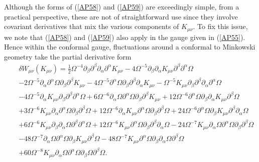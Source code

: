 Although the forms of (\ref{AP58}) and (\ref{AP59}) are exceedingly simple, from a practical perspective, these are not of straightforward use since they involve covariant derivatives that mix the various components of $K_{\mu\nu}$. To fix this issue, we note that (\ref{AP58}) and (\ref{AP59}) also apply in the gauge given in (\ref{AP55}). Hence within the conformal gauge, fluctuations around a conformal to Minkowski geometry take the partial derivative form
%
\begin{eqnarray}
&&\delta W_{\mu\nu}(K_{\mu\nu})=\frac{1}{2}\Omega^{-4}\partial_{\beta}\partial^{\beta}\partial_{\alpha}\partial^{\alpha}K_{\mu \nu}-  4\Omega^{-5} \partial_{\beta}\partial_{\alpha}K_{\mu \nu} \partial^{\beta}\partial^{\alpha}\Omega 
\nonumber\\
&&- 2\Omega^{-5}  \partial_{\alpha}\partial^{\alpha}\Omega \partial_{\beta}\partial^{\beta}K_{\mu \nu}-  4 \Omega^{-5}\partial^{\alpha}\Omega \partial_{\beta}\partial^{\beta}\partial_{\alpha}K_{\mu \nu}  
-  \Omega^{-5}K_{\mu \nu} \partial_{\beta}\partial^{\beta}\partial_{\alpha}\partial^{\alpha}\Omega 
\nonumber\\
&& -  4\Omega^{-5} \partial_{\alpha}K_{\mu \nu} \partial_{\beta}\partial^{\beta}\partial^{\alpha}\Omega 
+ 6\Omega^{-6} \partial_{\alpha}\Omega \partial^{\alpha}\Omega \partial_{\beta}\partial^{\beta}K_{\mu \nu} + 12\Omega^{-6} \partial^{\alpha}\Omega \partial_{\beta}\partial_{\alpha}K_{\mu \nu} \partial^{\beta}\Omega 
\nonumber\\
&&+ 3\Omega^{-6} K_{\mu \nu} \partial_{\alpha}\partial^{\alpha}\Omega \partial_{\beta}\partial^{\beta}\Omega + 12 \Omega^{-6}\partial_{\alpha}K_{\mu \nu} \partial^{\alpha}\Omega \partial_{\beta}\partial^{\beta}\Omega+ 24\Omega^{-6}  \partial^{\alpha}\Omega \partial_{\beta}K_{\mu \nu} \partial^{\beta}\partial_{\alpha}\Omega  
\nonumber\\
&&+ 6\Omega^{-6} K_{\mu \nu} \partial_{\beta}\partial_{\alpha}\Omega \partial^{\beta}\partial^{\alpha}\Omega 
+ 12\Omega^{-6} K_{\mu \nu} \partial^{\alpha}\Omega \partial_{\beta}\partial^{\beta}\partial_{\alpha}\Omega -  24 \Omega^{-7}K_{\mu \nu} \partial_{\alpha}\Omega \partial^{\alpha}\Omega \partial_{\beta}\partial^{\beta}\Omega  
\nonumber\\
&&-  48\Omega^{-7}  \partial_{\alpha}\Omega \partial^{\alpha}\Omega \partial_{\beta}K_{\mu \nu} \partial^{\beta}\Omega-  48\Omega^{-7}  K_{\mu \nu} \partial^{\alpha}\Omega \partial_{\beta}\partial_{\alpha}\Omega \partial^{\beta}\Omega 
\nonumber\\
&&
+ 60\Omega^{-8} K_{\mu \nu} \partial_{\alpha}\Omega \partial^{\alpha}\Omega \partial_{\beta}\Omega \partial^{\beta}\Omega.
\label{AP60}
\end{eqnarray}
